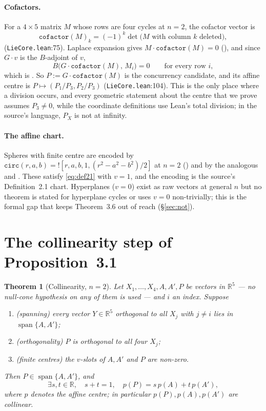 \documentclass[11pt]{article}
\newtheorem{theorem}{Theorem}
\theoremstyle{definition}
\theoremstyle{remark}
\newcommand{\src}[3]{\texttt{#2}:#3}
\newcommand{\RR}{\mathbb{R}}
\begin{document}
\paragraph{Cofactors.} For a $4\times5$ matrix $M$ whose rows are four cycles at $n=2$, the cofactor
vector is
\[
\texttt{cofactor}(M)_k=(-1)^k\det\bigl(M\text{ with column }k\text{ deleted}\bigr),
\]
 (\src{PaperK}{LieCore.lean}{75}). Laplace expansion gives
$M\cdot\texttt{cofactor}(M)=0$ (), and since $G\cdot v$ is the
$B$-adjoint of $v$,
\begin{equation}\label{eq:cofactororth}
B\bigl(G\cdot\texttt{cofactor}(M),\,M_i\bigr)=0 \qquad\text{for every row } i,
\end{equation}
which is . So $P:=G\cdot\texttt{cofactor}(M)$ is the concurrency
candidate, and its affine centre is  $P\mapsto(P_1/P_3,P_2/P_3)$
(\src{PaperK}{LieCore.lean}{104}). This is the only place where a division occurs, and every
geometric statement about the centre that we prove assumes $P_3\neq0$, while the coordinate
definitions use Lean's total division; in the source's language, $P_X$ is not at infinity.

\paragraph{The affine chart.} Spheres with finite centre are encoded by
$\texttt{circ}(r,a,b)=![r,a,b,1,(r^2-a^2-b^2)/2]$ at $n=2$ () and by the
analogous  and . These satisfy \eqref{eq:def21} with $v=1$, and
the encoding is the source's Definition~2.1 chart. Hyperplanes ($v=0$) exist as raw vectors at
general $n$ but no theorem is stated for hyperplane cycles or uses $v=0$ non-trivially; this is the
formal gap that keeps Theorem~3.6 out of reach (\S\ref{sec:not}).

\section{The collinearity step of Proposition~3.1}\label{sec:prop31}

\begin{theorem}[Collinearity, $n=2$]\label{thm:prop31}
Let $X_1,\dots,X_4,A,A',P$ be vectors in $\RR^5$ --- no null-cone hypothesis on any of them is
used --- and $i$ an index. Suppose
\begin{enumerate}
\item (spanning) every vector $Y\in\RR^5$ orthogonal to all $X_j$ with $j\neq i$ lies in
$\operatorname{span}\{A,A'\}$;
\item (orthogonality) $P$ is orthogonal to all four $X_j$;
\item (finite centres) the $v$-slots of $A,A'$ and $P$ are non-zero.
\end{enumerate}
Then $P\in\operatorname{span}\{A,A'\}$, and
\[
\exists s,t\in\RR,\quad s+t=1,\quad p(P)=s\,p(A)+t\,p(A'),
\]
where $p$ denotes the affine centre; in particular $p(P),p(A),p(A')$ are collinear.
\end{theorem}
\end{document}
